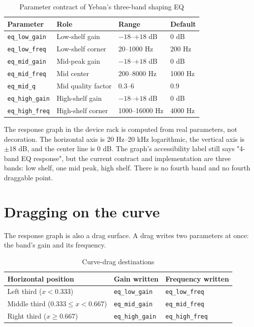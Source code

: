 \begin{table}[htbp]
\centering
\small
\begin{tabular}{@{}llll@{}}
\hline
Parameter & Role & Range & Default \\
\hline
\texttt{eq\_low\_gain} & Low-shelf gain & $-18$–$+18$ dB & 0 dB \\
\texttt{eq\_low\_freq} & Low-shelf corner & 20–1000 Hz & 200 Hz \\
\texttt{eq\_mid\_gain} & Mid-peak gain & $-18$–$+18$ dB & 0 dB \\
\texttt{eq\_mid\_freq} & Mid center & 200–8000 Hz & 1000 Hz \\
\texttt{eq\_mid\_q} & Mid quality factor & 0.3–6 & 0.9 \\
\texttt{eq\_high\_gain} & High-shelf gain & $-18$–$+18$ dB & 0 dB \\
\texttt{eq\_high\_freq} & High-shelf corner & 1000–16000 Hz & 4000 Hz \\
\hline
\end{tabular}
\caption{Parameter contract of Yeban's three-band shaping EQ}
\label{tab:eq-params}
\end{table}

The response graph in the device rack is computed from real parameters, not decoration. The horizontal axis is 20 Hz–20 kHz logarithmic, the vertical axis is $\pm18$ dB, and the center line is 0 dB. The graph's accessibility label still says "4-band EQ response", but the current contract and implementation are three bands: low shelf, one mid peak, high shelf. There is no fourth band and no fourth draggable point.


\section{Dragging on the curve}

The response graph is also a drag surface. A drag writes two parameters at once: the band's gain and its frequency.

\begin{table}[htbp]
\centering
\small
\begin{tabular}{@{}lll@{}}
\hline
Horizontal position & Gain written & Frequency written \\
\hline
Left third ($x<0.333$) & \texttt{eq\_low\_gain} & \texttt{eq\_low\_freq} \\
Middle third ($0.333\le x<0.667$) & \texttt{eq\_mid\_gain} & \texttt{eq\_mid\_freq} \\
Right third ($x\ge0.667$) & \texttt{eq\_high\_gain} & \texttt{eq\_high\_freq} \\
\hline
\end{tabular}
\caption{Curve-drag destinations}
\label{tab:eq-drag}
\end{table}

